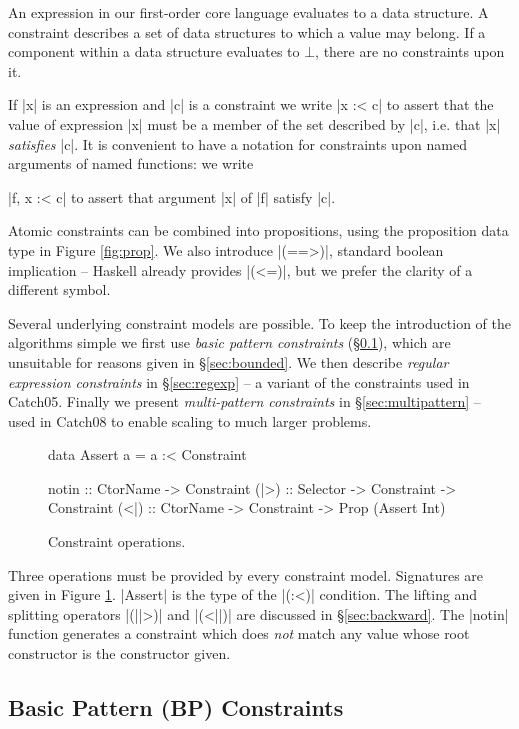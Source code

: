 \documentclass[preprint]{sigplanconf}
\begin{document}
An expression in our first-order core language evaluates to a data structure. A constraint describes a set of data structures to which a value may belong. If a component within a data structure evaluates to $\bot{}$, there are no constraints upon it.

If |x| is an expression and |c| is a constraint we write |x :< c| to assert that the value of expression |x| must be a member of the set described by |c|, i.e. that |x| \textit{satisfies} |c|. It is convenient to have a notation for constraints upon named arguments of named functions: we write \ignore|f, x :< c| to assert that argument |x| of |f| satisfy |c|.

Atomic constraints can be combined into propositions, using the proposition data type in Figure \ref{fig:prop}. We also introduce |(==>)|, standard boolean implication -- Haskell already provides |(<=)|, but we prefer the clarity of a different symbol.

Several underlying constraint models are possible. To keep the introduction of the algorithms simple we first use \textit{basic pattern constraints} (\S\ref{sec:basic}), which are unsuitable for reasons given in \S\ref{sec:bounded}. We then describe \textit{regular expression constraints} in \S\ref{sec:regexp} -- a variant of the constraints used in Catch05. Finally we present \textit{multi-pattern constraints} in \S\ref{sec:multipattern} -- used in Catch08 to enable scaling to much larger problems.

\begin{figure}
\begin{code}
data Assert a = a :< Constraint

notin :: CtorName -> Constraint
(|>) :: Selector -> Constraint -> Constraint
(<|) :: CtorName -> Constraint -> Prop (Assert Int)
\end{code}
\caption{Constraint operations.}
\label{fig:constraint}
\end{figure}

Three operations must be provided by every constraint model. Signatures are given in Figure \ref{fig:constraint}. |Assert| is the type of the |(:<)| condition. The lifting and splitting operators |(||>)| and |(<||)| are discussed in \S\ref{sec:backward}. The |notin| function generates a constraint which does \textit{not} match any value whose root constructor is the constructor given.


\subsection{Basic Pattern (BP) Constraints}
\label{sec:basic}
\end{document}
